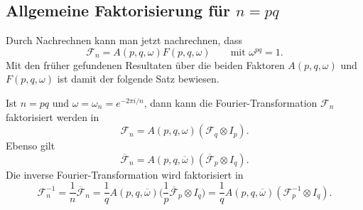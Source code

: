 %
%
%

%
%
\subsection{Allgemeine Faktorisierung für $n=pq$}
Durch Nachrechnen kann man jetzt nachrechnen, dass
\[
\mathscr{F}_n = A(p,q,\omega) F(p,q,\omega)
\qquad\text{mit $\omega^{pq}=1$}.
\]
Mit den früher gefundenen Resultaten über die beiden Faktoren
$A(p,q,\omega)$ und $F(p,q,\omega)$ ist damit der folgende
Satz bewiesen.

\begin{satz}
\label{buch:diskret:vandermonde:satz:fourierfaktorisierung}
Ist $n=pq$ und $\omega=\omega_n=e^{-2\pi i/n}$,
dann kann die Fourier-Transformation $\mathscr{F}_n$
faktorisiert werden in
\[
\mathscr{F}_n
=
A(p,q,\omega)
(
\mathscr{F}_q
\otimes
I_p
).
\]
Ebenso gilt
\[
\overline{\mathscr{F}}_n
=
A(p,q,\overline{\omega})
(
\overline{\mathscr{F}}_p
\otimes
I_q
).
\]
Die inverse Fourier-Transformation wird faktorisiert in
\[
\mathscr{F}_n^{-1}
=
\frac{1}{n}\overline{\mathscr{F}}_n
=
\frac{1}{q} A(p,q,\overline{\omega})
\biggl(
\frac1p\overline{\mathscr{F}}_p
\otimes
I_q
\biggr)
=
\frac{1}{q} A(p,q,\overline{\omega})
(\mathscr{F}_p^{-1} \otimes I_q).
\]
\end{satz}

